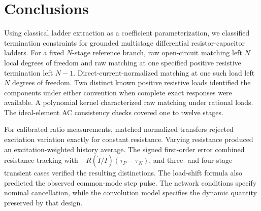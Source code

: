 \section{Conclusions}

Using classical ladder extraction as a coefficient parameterization, we classified termination constraints for grounded multistage differential resistor-capacitor ladders. For a fixed $N$-stage reference branch, raw open-circuit matching left $N$ local degrees of freedom and raw matching at one specified positive resistive termination left $N-1$. Direct-current-normalized matching at one such load left $N$ degrees of freedom. Two distinct known positive resistive loads identified the components under either convention when complete exact responses were available. A polynomial kernel characterized raw matching under rational loads. The ideal-element AC consistency checks covered one to twelve stages.

For calibrated ratio measurements, matched normalized transfers rejected excitation variation exactly for constant resistance. Varying resistance produced an excitation-weighted history average. The signed first-order error combined resistance tracking with $-R(\dot I/I)(\tau_P-\tau_N)$, and three- and four-stage transient cases verified the resulting distinctions. The load-shift formula also predicted the observed common-mode step pulse. The network conditions specify nominal cancellation, while the convolution model specifies the dynamic quantity preserved by that design.
